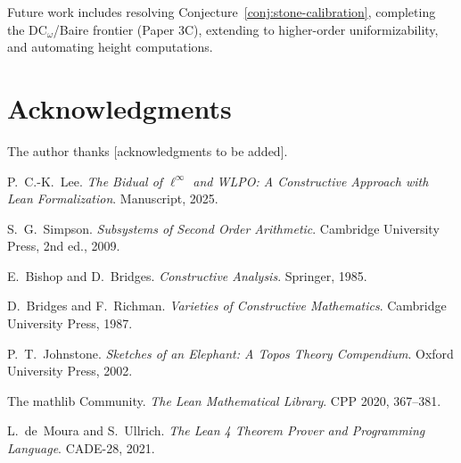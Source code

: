 \documentclass[11pt]{article}
\begin{document}
\noindent Future work includes resolving Conjecture~\ref{conj:stone-calibration}, completing the DC$_\omega$/Baire frontier (Paper 3C), extending to higher-order uniformizability, and automating height computations.

\section*{Acknowledgments}

The author thanks [acknowledgments to be added].

\begin{thebibliography}{10}

P.~C.-K.~Lee.
\emph{The Bidual of $\ell^\infty$ and WLPO: A Constructive Approach with Lean Formalization}.
Manuscript, 2025.

S.~G.~Simpson.
\emph{Subsystems of Second Order Arithmetic}.
Cambridge University Press, 2nd ed., 2009.

E.~Bishop and D.~Bridges.
\emph{Constructive Analysis}.
Springer, 1985.

D.~Bridges and F.~Richman.
\emph{Varieties of Constructive Mathematics}.
Cambridge University Press, 1987.

P.~T.~Johnstone.
\emph{Sketches of an Elephant: A Topos Theory Compendium}.
Oxford University Press, 2002.

The mathlib Community.
\emph{The Lean Mathematical Library}.
CPP 2020, 367--381.

L.~de~Moura and S.~Ullrich.
\emph{The Lean 4 Theorem Prover and Programming Language}.
CADE-28, 2021.

\end{thebibliography}
\end{document}

